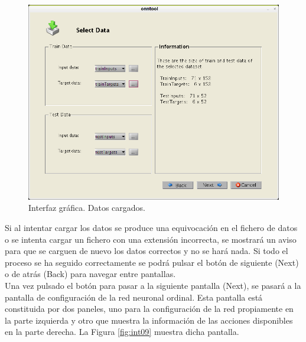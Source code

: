 		\begin{figure}[htbp]
			\centering
			\includegraphics[scale=0.5]{interfaz/interface08.png}
			\caption{Interfaz gráfica. Datos cargados.}
			\label{fig:int08}
		\end{figure}
		
		Si al intentar cargar los datos se produce una equivocación en el fichero de datos o se intenta cargar un fichero con una extensión incorrecta, se mostrará un aviso para que se carguen de nuevo los datos correctos y no se hará nada. Si todo el proceso se ha seguido correctamente se podrá pulsar el botón de siguiente (Next) o de atrás (Back) para navegar entre pantallas.\\
		
		Una vez pulsado el botón para pasar a la siguiente pantalla (Next), se pasará a la pantalla de configuración de la red neuronal ordinal. Esta pantalla está constituida por dos paneles, uno para la configuración de la red propiamente en la parte izquierda y otro que muestra la información de las acciones disponibles en la parte derecha. La Figura \ref{fig:int09} muestra dicha pantalla.\\
		
